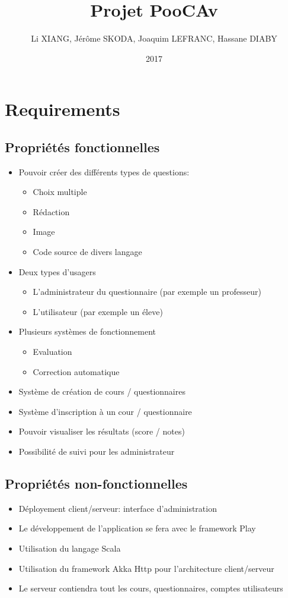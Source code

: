 \documentclass[12pt]{article}
\title{Projet PooCAv}
\author{Li XIANG, Jérôme SKODA, Joaquim LEFRANC, Hassane DIABY}
\date{2017}
\begin{document}
\maketitle
\section{Requirements}

\subsection{Propriétés fonctionnelles}
\begin{itemize}
  \item Pouvoir créer des différents types de questions:
    \begin{itemize}
      \item Choix multiple
      \item Rédaction
      \item Image
      \item Code source de divers langage
    \end{itemize}
  \item Deux types d'usagers
    \begin{itemize}
      \item L'administrateur du questionnaire (par exemple un professeur)
      \item L'utilisateur (par exemple un éleve)
    \end{itemize}
  \item Plusieurs systèmes de fonctionnement
    \begin{itemize}
      \item Evaluation
      \item Correction automatique
    \end{itemize}
	\item Système de création de cours / questionnaires
	\item Système d'inscription à un cour / questionnaire
  \item Pouvoir visualiser les résultats (score / notes)
  \item Possibilité de suivi pour les administrateur
\end{itemize}

\subsection{Propriétés non-fonctionnelles}
\begin{itemize}
  \item Déployement client/serveur: interface d'administration
	\item Le développement de l'application se fera avec le framework Play
	\item Utilisation du langage Scala
	\item Utilisation du framework Akka Http pour l'architecture client/serveur
	\item Le serveur contiendra tout les cours, questionnaires, comptes utilisateurs
\end{itemize}
\end{document}
